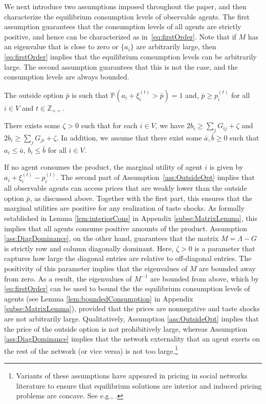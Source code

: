 \documentclass[opre,nonblindrev]{informs3} %
\begin{document}
We next introduce two assumptions 
imposed throughout the paper, and then characterize the equilibrium consumption levels of observable agents.
The first assumption guarantees that  the  consumption levels of all agents are strictly positive, and hence
 can  be characterized as in~\eqref{eq:firstOrder}.
{Note that if $M$ has an eigenvalue that is close to zero or $\{a_i\}$ are arbitrarily large, then \eqref{eq:firstOrder} implies that the equilibrium consumption levels can be arbitrarily large.}
 The second assumption guarantees that
 this is not the case, and the consumption levels are always bounded.
\begin{assumption}\label{ass:OutsideOpt}
	The outside option 
	$\bar p$
	is such that $\mathbb{P}(a_i + \xi_i^{(t)} > \bar p )=1$
	and, $\bar p \geq p_i^{(t)}$
	 for all $i\in V$ and $t\in \mathbb{Z}_{++}$.
\end{assumption}
\begin{assumption} \label{ass:DiagDominance}
	There exists some 
	$\zeta>0$
	such that
	for each $i\in V$, we have
	$	2b_i \geq  \sum_j G_{ij}  + \zeta 	$
	and
	$	2b_i \geq  \sum_j G_{ji}  + \zeta $.	
In addition,
		we assume that there exist some
		$\bar{a},\bar{b} \geq 0$ such that
		$a_i \leq \bar{a}$, $b_i \leq \bar{b}$ for all $i\in V$.
\end{assumption}
If no agent consumes the product, the marginal utility of agent $i$ is given by $a_i+ \xi_i^{(t)} - p_i^{(t)}$.
The second part of 
	Assumption~\ref{ass:OutsideOpt}   implies that all 
	observable
	agents can access prices that are weakly lower than the outside option $\bar p$, as discussed above.
	Together with the first part, this ensures that the marginal utilities are positive 
 for any realization of taste shocks. 
As formally established in Lemma
\ref{lem:interiorCons} in Appendix \ref{subse:MatrixLemma},
this implies that
all agents consume positive amounts of the product.
Assumption \ref{ass:DiagDominance}, on the other hand, guarantees that
the matrix $M=\Lambda-G$ is strictly row and column diagonally dominant.
Here, $\zeta >0$ is a parameter that captures how large the diagonal entries are relative to off-diagonal entries. The
positivity of this parameter implies that  the eigenvalues of $M$ are bounded away from zero.
As a result, the eigenvalues of $M^{-1}$ are bounded from above, which
by \eqref{eq:firstOrder} can be used to bound the
  the equilibrium consumption levels of agents  (see Lemma \ref{lem:boundedConsumption} in Appendix \ref{subse:MatrixLemma}),
provided that the prices are nonnegative and taste shocks are not arbitrarily large.
Qualitatively, Assumption \ref{ass:OutsideOpt} implies that the price of the outside option is not prohibitively large, whereas Assumption \ref{ass:DiagDominance} implies that the network externality
that an agent exerts on the rest of the network (or vice versa) is not too large.\footnote{Variants of these assumptions have appeared in pricing in social networks literature to ensure that equilibrium solutions are interior and induced pricing problems are concave. See e.g., 	\cite{ballester2006s,candogan2012optimal,fainmesser2015pricing,zhou2015key}.}
\end{document}
